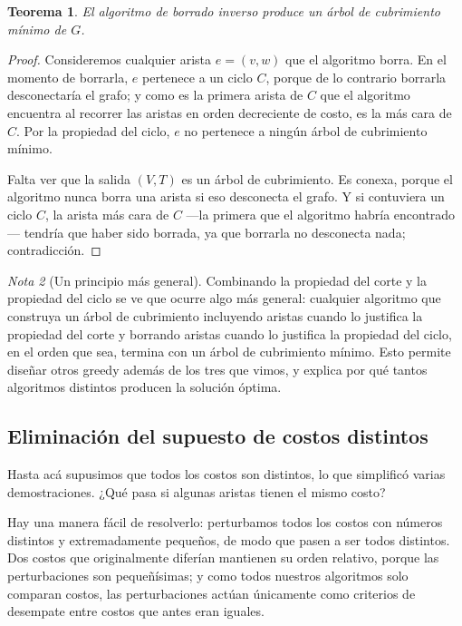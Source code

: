 \documentclass[12pt, spanish, oneside, openany]{book}
\theoremstyle{uprightplain}
\newtheorem{teorema}{Teorema}[section]
\theoremstyle{definition}
\theoremstyle{remark}
\newtheorem{nota}[teorema]{Nota}
\theoremstyle{definition}
\begin{document}
\begin{teorema}
\label{teo:borrado-inverso}
El algoritmo de borrado inverso produce un árbol de cubrimiento mínimo de $G$.
\end{teorema}
\begin{proof}
Consideremos cualquier arista $e=(v,w)$ que el algoritmo borra. En el momento de borrarla, $e$ pertenece a un ciclo $C$, porque de lo contrario borrarla desconectaría el grafo; y como es la primera arista de $C$ que el algoritmo encuentra al recorrer las aristas en orden decreciente de costo, es la más cara de $C$. Por la propiedad del ciclo, $e$ no pertenece a ningún árbol de cubrimiento mínimo.

Falta ver que la salida $(V,T)$ es un árbol de cubrimiento. Es conexa, porque el algoritmo nunca borra una arista si eso desconecta el grafo. Y si contuviera un ciclo $C$, la arista más cara de $C$ ---la primera que el algoritmo habría encontrado--- tendría que haber sido borrada, ya que borrarla no desconecta nada; contradicción.
\end{proof}

\begin{nota}[Un principio más general]
Combinando la propiedad del corte y la propiedad del ciclo se ve que ocurre algo más general: cualquier algoritmo que construya un árbol de cubrimiento incluyendo aristas cuando lo justifica la propiedad del corte y borrando aristas cuando lo justifica la propiedad del ciclo, en el orden que sea, termina con un árbol de cubrimiento mínimo. Esto permite diseñar otros greedy además de los tres que vimos, y explica por qué tantos algoritmos distintos producen la solución óptima.
\end{nota}

\subsection{Eliminación del supuesto de costos distintos}

Hasta acá supusimos que todos los costos son distintos, lo que simplificó varias demostraciones. ¿Qué pasa si algunas aristas tienen el mismo costo?

Hay una manera fácil de resolverlo: perturbamos todos los costos con números distintos y extremadamente pequeños, de modo que pasen a ser todos distintos. Dos costos que originalmente diferían mantienen su orden relativo, porque las perturbaciones son pequeñísimas; y como todos nuestros algoritmos solo comparan costos, las perturbaciones actúan únicamente como criterios de desempate entre costos que antes eran iguales.
\end{document}
